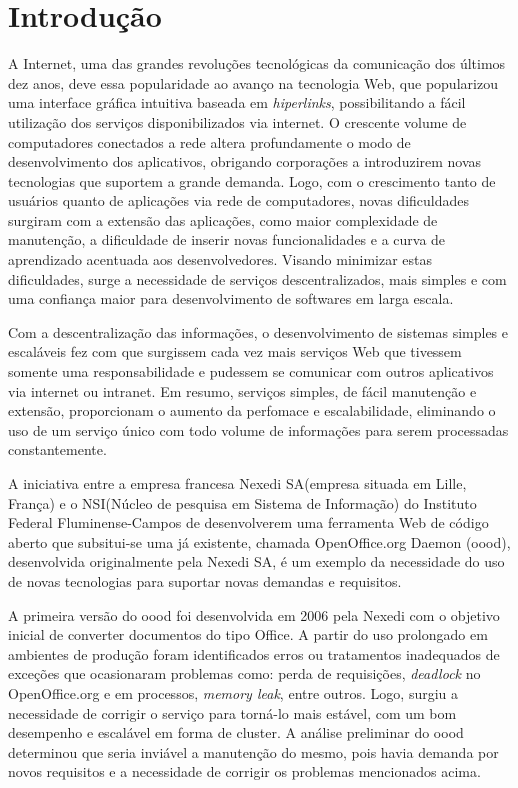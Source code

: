 \chapter{Introdução}
A Internet, uma das grandes revoluções tecnológicas da comunicação dos últimos dez anos, deve essa popularidade ao avanço na tecnologia Web, que popularizou uma interface gráfica intuitiva baseada em \textit{hiperlinks}, possibilitando a fácil utilização dos serviços disponibilizados via internet. O crescente volume de computadores conectados a rede altera profundamente o modo de desenvolvimento dos aplicativos, obrigando corporações a introduzirem novas tecnologias que suportem a grande demanda. Logo, com o crescimento tanto de usuários quanto de aplicações via rede de computadores, novas dificuldades surgiram com a extensão das aplicações, como maior complexidade de manutenção, a dificuldade de inserir novas funcionalidades e a curva de aprendizado acentuada aos desenvolvedores. Visando minimizar estas dificuldades, surge a necessidade de serviços descentralizados, mais simples e com uma confiança maior para desenvolvimento de softwares em larga escala.

Com a descentralização das informações, o desenvolvimento de sistemas simples e escaláveis fez com que surgissem cada vez mais serviços Web que tivessem somente uma responsabilidade e pudessem se comunicar com outros aplicativos via internet ou intranet. Em resumo, serviços simples, de fácil manutenção e extensão, proporcionam o aumento da perfomace e escalabilidade, eliminando o uso de um serviço único com todo volume de informações para serem processadas constantemente.

A iniciativa entre a empresa francesa Nexedi SA(empresa situada em Lille, França) e o NSI(Núcleo de pesquisa em Sistema de Informação) do Instituto Federal Fluminense-Campos de desenvolverem uma ferramenta Web de código aberto que subsitui-se uma já existente, chamada OpenOffice.org Daemon (oood), desenvolvida originalmente pela Nexedi SA, é um exemplo da necessidade do uso de novas tecnologias para suportar novas demandas e requisitos.

A primeira versão do oood foi desenvolvida em 2006 pela Nexedi com o objetivo inicial de converter documentos do tipo Office. A partir do uso prolongado em ambientes de produção foram identificados erros ou tratamentos inadequados de exceções que ocasionaram problemas como: perda de requisições, \textit{deadlock} no OpenOffice.org e em processos, \textit{memory leak}, entre outros. Logo, surgiu a necessidade de corrigir o serviço para torná-lo mais estável, com um bom desempenho e escalável em forma de cluster. A análise preliminar do oood determinou que seria inviável a manutenção do mesmo, pois havia demanda por novos requisitos e a necessidade de corrigir os problemas mencionados acima.


